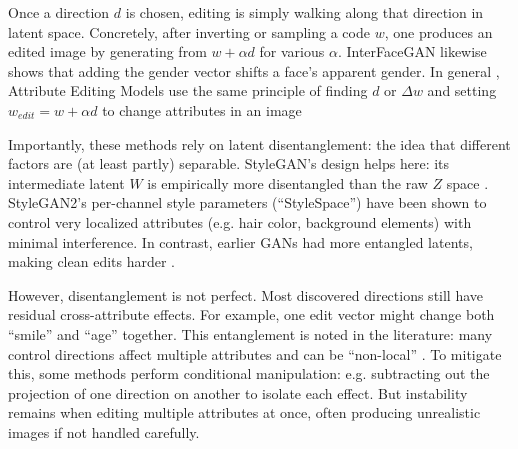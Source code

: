 Once a direction $d$ is chosen,  editing is simply walking along that direction in latent space. Concretely, after inverting or sampling a code $w$, one produces an edited image by generating from
$w + \alpha d$ for various $\alpha$. 
InterFaceGAN likewise shows that adding the gender vector shifts a face's apparent gender. 
In general , Attribute Editing Models use the same principle of finding $d$ or $\Delta w$ and setting $w_{edit} = w + \alpha d$ to change
attributes in an image \citep{härkönen2020ganspacediscoveringinterpretablegan,shen2020interpretinglatentspacegans,li2023preim3d3dconsistentprecise,wu2020stylespaceanalysisdisentangledcontrols}

Importantly, these methods rely on latent disentanglement: the idea that different factors are (at least partly) separable. 
StyleGAN's design helps here: its intermediate latent $W$ is empirically more disentangled than the raw $Z$ space \citep{wu2020stylespaceanalysisdisentangledcontrols}.
StyleGAN2's per-channel style parameters (“StyleSpace”) have been shown to control very localized attributes (e.g. hair color, background elements) with minimal interference.
In contrast, earlier GANs had more entangled latents, making clean edits harder \citep{salehi2020generativeadversarialnetworksgans,Creswell_2018}.

However, disentanglement is not perfect. Most discovered directions still have residual cross-attribute effects. For example, 
one edit vector might change both “smile” and “age” together. This entanglement is noted in the literature: 
many control directions affect multiple attributes and can be “non-local” \citep{wu2020stylespaceanalysisdisentangledcontrols}.
To mitigate this, some methods perform conditional manipulation: e.g. subtracting out the projection of one direction on another to isolate each effect. 
But instability remains when editing multiple attributes at once, often producing unrealistic images if not handled carefully.

